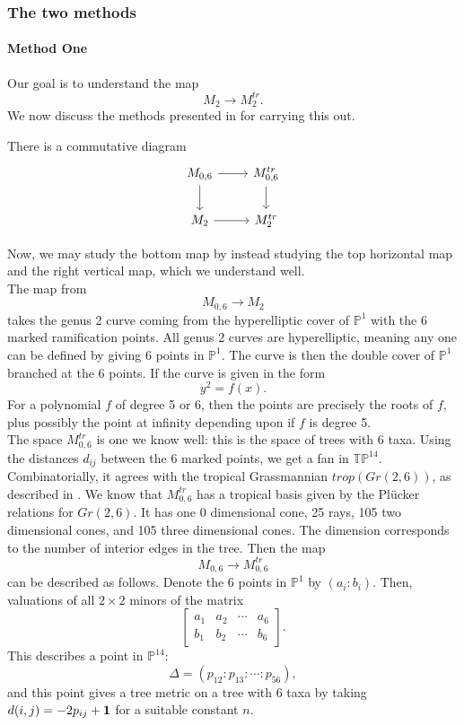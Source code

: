 \newpage
\subsubsection{The two methods}
\paragraph{Method One}
Our goal is to understand the map
$$
M_2 \rightarrow M_2^{tr}.
$$
We now discuss the methods presented in \cite{section5} for carrying this out.

\begin{theorem} There is a commutative diagram
\[
\begin{tikzcd}
M_{0,6} \arrow{r}{} \arrow[swap]{d}{} & M_{0,6}^{tr} \arrow{d}{} \\
M_2  \arrow{r}{} & M_2^{tr}
\end{tikzcd}
\]
\end{theorem}
Now, we may study the bottom map by instead studying the top horizontal map and the right vertical map, which we understand well.\\


The map from 
$$
M_{0,6} \rightarrow M_2
$$
takes the genus 2 curve coming from the hyperelliptic cover of $\mathbb{P}^1$ with the 6 marked ramification points.
All genus 2 curves are hyperelliptic, meaning any one can be defined by giving 6 points in $\mathbb{P}^1$. The curve is then the double cover of $\mathbb{P}^1$ branched at the 6 points. If the curve is given in the form
$$
y^2 = f(x).
$$
For a polynomial $f$ of degree 5 or 6, then the points are precisely the roots of $f$, plus possibly the point at infinity depending upon if $f$ is degree 5.
\\

The space $M_{0,6}^{tr}$ is one we know well: this is the space of trees with 6 taxa. Using the distances $d_{ij}$ between the 6 marked points, we get a fan in $\mathbb{TP}^{14}$. Combinatorially, it agrees with the tropical Grassmannian $trop(Gr(2,6))$, as described in \cite{tropicalbook}. We know that $M_{0,6}^{tr}$ has a tropical basis given by the Pl\"{u}cker relations for $Gr(2,6)$. It has one 0 dimensional cone, 25 rays,  105 two dimensional cones, and 105 three dimensional cones. The dimension corresponds to the number of interior edges in the tree.
Then the map
$$
M_{0,6} \rightarrow M_{0,6}^{tr}
$$
can be described as follows. Denote the 6 points in $\mathbb{P}^1$ by $(a_i: b_i)$. Then, valuations of all $2 \times 2$ minors of the matrix
$$
\begin{bmatrix}
a_1 & a_2 & \cdots & a_6 \\
b_1 & b_2 & \cdots & b_6
\end{bmatrix}.
$$
This describes a point in $\mathbb{P}^{14}$:
$$
\Delta = (p_{12}: p_{13}: \cdots: p_{56}),
$$
and this point gives a tree metric on a tree with 6 taxa by taking $d(i,j) = -2p_{ij} + \bf{1}$ for a suitable constant $n$.\\ 

